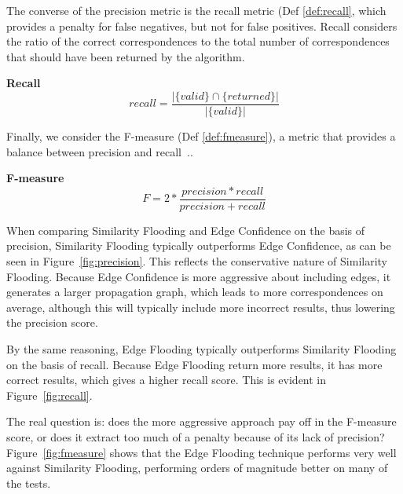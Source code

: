 \documentclass[letterpaper,twocolumn,12pt]{article}
\begin{document}
The converse of the precision metric is the recall metric (Def \ref{def:recall}, which provides a penalty for false negatives, but not for false positives. 
Recall considers the ratio of the correct correspondences to the total number of correspondences that should have been returned by the algorithm.

\begin{defn}
\textbf{Recall}
\label{def:recall}
$$
	recall = \frac{|\{valid \} \cap  \{returned \}|}{|\{valid \}|}
$$
\end{defn}

Finally, we consider the F-measure (Def \ref{def:fmeasure}), a metric that provides a balance between precision and recall~\cite{rijsbergen:1979:ir}.. 

\begin{defn}
				\textbf{F-measure}
\label{def:fmeasure}
$$
	F = 2*\frac{precision * recall}{precision + recall}	
$$
\end{defn}

When comparing Similarity Flooding and Edge Confidence on the basis of precision, Similarity Flooding typically outperforms Edge Confidence, as can be seen in Figure~\ref{fig:precision}. 
This reflects the conservative nature of Similarity Flooding.
Because Edge Confidence is more aggressive about including edges, it generates a larger propagation graph, which leads to more correspondences on average, although this will typically include more incorrect results, thus lowering the precision score.

By the same reasoning, Edge Flooding typically outperforms Similarity Flooding on the basis of recall. 
Because Edge Flooding return more results, it has more correct results, which gives a higher recall score. 
This is evident in Figure~\ref{fig:recall}.

The real question is: does the more aggressive approach pay off in the F-measure score, or does it extract too much of a penalty because of its lack of precision?
Figure~\ref{fig:fmeasure} shows that the Edge Flooding technique performs very well against Similarity Flooding, performing orders of magnitude better on many of  the tests.
\end{document}
